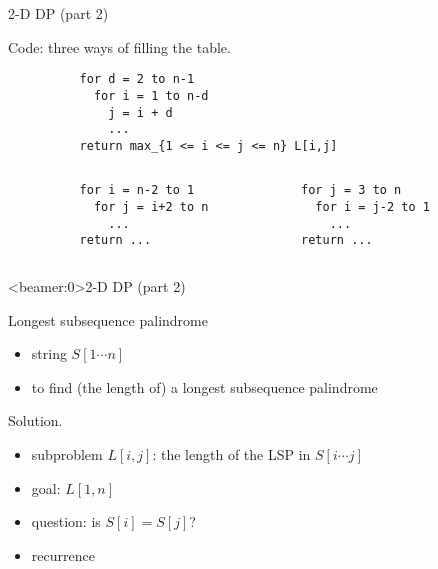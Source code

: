 \begin{frame}[fragile]{2-D DP (part 2)}
  \begin{block}{Code: three ways of filling the table.}
    \begin{center}
        \begin{verbatim}
          for d = 2 to n-1
            for i = 1 to n-d
              j = i + d
              ...
          return max_{1 <= i <= j <= n} L[i,j]
       \end{verbatim}
    \end{center}

    \begin{columns}[t]
        \begin{verbatim}
          for i = n-2 to 1
            for j = i+2 to n
              ...
          return ...
        \end{verbatim}
        \begin{verbatim}
          for j = 3 to n
            for i = j-2 to 1
              ...
          return ...
       \end{verbatim}
    \end{columns}
  \end{block}
\end{frame}
\begin{frame}<beamer:0>{2-D DP (part 2)}
  \begin{exampleblock}{Longest subsequence palindrome }
    \begin{itemize}
      \item string $S[1 \cdots n]$
      \item to find (the length of) a longest subsequence palindrome
    \end{itemize}
  \end{exampleblock}

  \pause
  \begin{block}{Solution.}
    \begin{itemize}
      \item subproblem $L[i,j]$: the length of the LSP in $S[i \cdots j]$
      \item goal: $L[1,n]$
      \item question: is $S[i] = S[j]$?
      \item recurrence
    \end{itemize}
  \end{block}
\end{frame}
